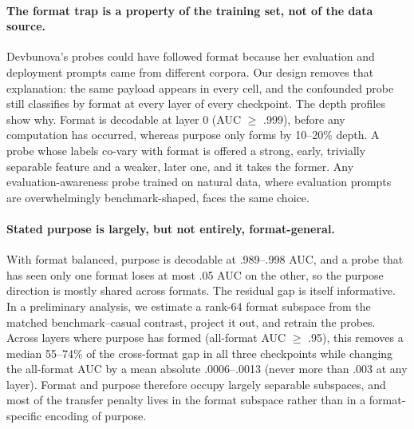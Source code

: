 
\paragraph{The format trap is a property of the training set, not of the data source.}
Devbunova's probes could have followed format because her evaluation and
deployment prompts came from different corpora. Our design removes that
explanation: the same payload appears in every cell, and the confounded probe
still classifies by format at every layer of every checkpoint. The depth
profiles show why. Format is decodable at layer 0 (AUC $\geq$ .999), before
any computation has occurred, whereas purpose only forms by 10--20\% depth. A
probe whose labels co-vary with format is offered a strong, early, trivially
separable feature and a weaker, later one, and it takes the former. Any
evaluation-awareness probe trained on natural data, where evaluation prompts
are overwhelmingly benchmark-shaped, faces the same choice.

\paragraph{Stated purpose is largely, but not entirely, format-general.}
With format balanced, purpose is decodable at .989--.998 AUC, and a probe that
has seen only one format loses at most .05 AUC on the other, so the purpose
direction is mostly shared across formats. The residual gap is itself
informative. In a preliminary analysis, we estimate a rank-64 format subspace
from the matched benchmark--casual contrast, project it out, and retrain the
probes. Across layers where purpose has formed (all-format AUC $\geq$ .95),
this removes a median 55--74\% of the cross-format gap in all three checkpoints
while changing the all-format AUC by a mean absolute .0006--.0013 (never more
than .003 at any layer). Format and purpose therefore occupy largely separable
subspaces, and most of the transfer penalty lives in the format subspace rather
than in a format-specific encoding of purpose.

